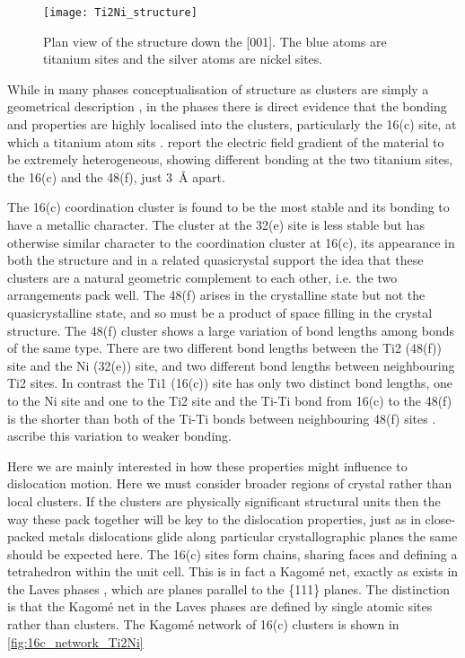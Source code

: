\begin{figure}
\centering
\texttt{[image: Ti2Ni\_structure]}
\caption[Plan view of the  structure.]{Plan view of the  structure down the [001]. The blue atoms are titanium sites and the silver atoms are nickel sites.\label{fig:Ti2Ni_plan}}
\end{figure}



While in many phases conceptualisation of structure as clusters are simply a geometrical description \cite{Steurer2006}, in the  phases there is direct evidence that the bonding and properties are highly localised into the clusters, particularly the 16(c) site, at which a titanium atom sits \cite{Ivanovic2006}. \citet{Ivanovic2006} report the electric field gradient of the material to be extremely heterogeneous, showing different bonding at the two titanium sites, the 16(c) and the 48(f), just \SI{3}{\angstrom} apart. 

The 16(c) coordination cluster is found to be the most stable and its bonding to have a metallic character. The cluster at the 32(e) site is less stable but has otherwise similar character to the coordination cluster at 16(c), its appearance in both the  structure and in a related quasicrystal support the idea that these clusters are a natural geometric complement to each other, i.e. the two arrangements pack well. The 48(f) arises in the crystalline state but not the quasicrystalline state, and so must be a product of space filling in the  crystal structure. The 48(f) cluster shows a large variation of bond lengths among bonds of the same type. There are two different bond lengths between the  Ti2 (48(f)) site and the Ni (32(e)) site, and two different bond lengths between neighbouring Ti2 sites. In contrast the Ti1 (16(c)) site has only two distinct bond lengths, one to the Ni site and one to the Ti2 site and the Ti-Ti bond from 16(c) to the 48(f) is the shorter than both of the Ti-Ti bonds between neighbouring 48(f) sites \cite{Yurko1959,Yurko1962,Ivanovic2006}.  \citet{Ivanovic2006} ascribe this variation to weaker bonding.


Here we are mainly interested in how these properties might influence to dislocation motion. Here we must consider broader regions of crystal rather than local clusters. If the clusters are physically significant structural units then the way these pack together will be key to the dislocation properties, just as in close-packed metals dislocations glide along particular crystallographic planes the same should be expected here. The 16(c) sites form chains, sharing faces and defining a tetrahedron within the unit cell. This is in fact a Kagom\'{e} net, exactly as exists in the Laves phases \cite{Stein2004,Stein2005}, which are planes parallel to the \{111\} planes. The distinction is that the Kagom\'{e} net in the Laves phases are defined by single atomic sites rather than clusters. The Kagom\'{e} network of 16(c) clusters is shown in \autoref{fig:16c_network_Ti2Ni}

